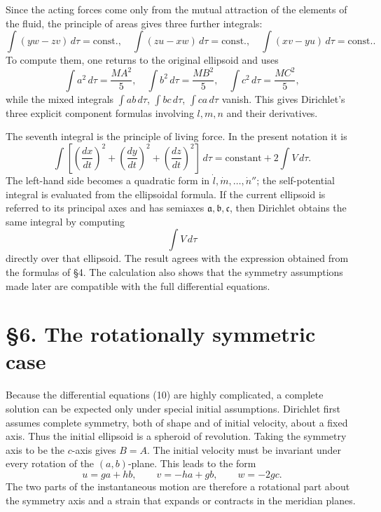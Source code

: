 \documentclass[11pt]{article}
\newcommand{\dd}{\,d}
\newcommand{\td}[1]{\frac{d #1}{dt}}
\begin{document}
Since the acting forces come only from the mutual attraction of the elements of the fluid, the principle of areas gives three further integrals:
\begin{equation}
 \int(yw-zv)\dd\tau=\text{const.},\quad
 \int(zu-xw)\dd\tau=\text{const.},\quad
 \int(xv-yu)\dd\tau=\text{const.}.
\end{equation}
To compute them, one returns to the original ellipsoid and uses
\[
 \int a^2\dd\tau=\frac{M A^2}{5},\quad
 \int b^2\dd\tau=\frac{M B^2}{5},\quad
 \int c^2\dd\tau=\frac{M C^2}{5},
\]
while the mixed integrals \(\int ab\dd\tau\), \(\int bc\dd\tau\), \(\int ca\dd\tau\) vanish.  This gives Dirichlet's three explicit component formulas involving \(l,m,n\) and their derivatives.

The seventh integral is the principle of living force.  In the present notation it is
\begin{equation}
 \int\left[\left(\td{x}\right)^2+
 \left(\td{y}\right)^2+\left(\td{z}\right)^2\right]\dd\tau
 =\text{constant}+2\int V\dd\tau.
\end{equation}
The left-hand side becomes a quadratic form in \(\dot l,\dot m,\ldots,\dot n''\); the self-potential integral is evaluated from the ellipsoidal formula.  If the current ellipsoid is referred to its principal axes and has semiaxes \(\mathfrak a,\mathfrak b,\mathfrak c\), then Dirichlet obtains the same integral by computing
\[
 \int V\dd\tau
\]
directly over that ellipsoid.  The result agrees with the expression obtained from the formulas of \S4.  The calculation also shows that the symmetry assumptions made later are compatible with the full differential equations.

\section*{\S6. The rotationally symmetric case}

Because the differential equations (10) are highly complicated, a complete solution can be expected only under special initial assumptions.  Dirichlet first assumes complete symmetry, both of shape and of initial velocity, about a fixed axis.  Thus the initial ellipsoid is a spheroid of revolution.  Taking the symmetry axis to be the \(c\)-axis gives \(B=A\).  The initial velocity must be invariant under every rotation of the \((a,b)\)-plane.  This leads to the form
\begin{equation}
 u=ga+hb,
 \qquad v=-ha+gb,
 \qquad w=-2gc.
\end{equation}
The two parts of the instantaneous motion are therefore a rotational part about the symmetry axis and a strain that expands or contracts in the meridian planes.
\end{document}
